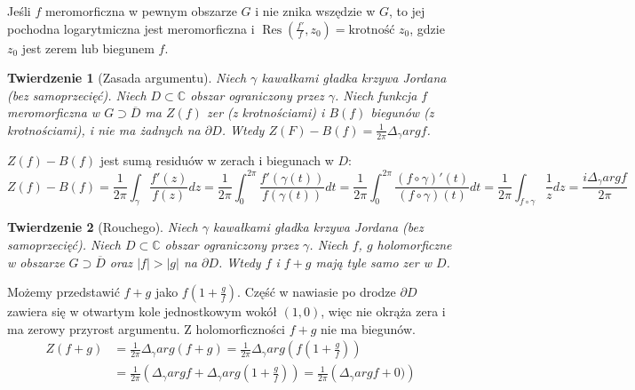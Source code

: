\documentclass[11pt]{article}
\newcommand{\abs}[1]{\left|#1\right|} %
\newcommand{\closure}[1]{\overline{#1}} %
\newcommand{\res}{\mathop{\text{Res}}\limits} %
\theoremstyle{plain}
\newtheorem*{theorem}{Twierdzenie}
\theoremstyle{definition}
\theoremstyle{remark}
\let\oldendproof\endproof
\renewenvironment{proof}[1][\proofname]{
  \oldproof[\textsc{\small #1}]
}{\oldendproof}
\begin{document}
Jeśli $ f $ meromorficzna w pewnym obszarze $G$ i nie znika wszędzie w $G$,
to jej pochodna logarytmiczna jest meromorficzna i $ \res(\frac{f'}{f}, z_0) = \text{krotność } z_0 $,
gdzie $ z_0 $ jest zerem lub biegunem $f$.


\begin{theorem}[Zasada argumentu]
  Niech $\gamma$ kawałkami gładka krzywa Jordana (bez samoprzecięć).
  Niech $ D \subset \mathbb{C} $ obszar ograniczony przez $ \gamma $.
  Niech funkcja $f$ meromorficzna w $ G \supset \closure{D} $ ma $ Z(f) $ zer (z krotnościami) i $ B(f) $ biegunów (z krotnościami), i nie ma żadnych na $ \partial D $.
  Wtedy $ Z(F) - B(f) = \frac{1}{2 \pi} \Delta_{\gamma} arg f $.
\end{theorem}

\begin{proof}
  $ Z(f) - B(f) $ jest sumą residuów w zerach i biegunach w $ D $: %
  $$
    Z(f) - B(f)
    = \frac{1}{2 \pi} \int_{\gamma} \frac{f'(z)}{f(z)} dz
    = \frac{1}{2 \pi} \int_{0}^{2 \pi} \frac{f'(\gamma(t))}{f(\gamma(t))} dt
    = \frac{1}{2 \pi} \int_{0}^{2 \pi} \frac{(f \circ \gamma)'(t)}{(f \circ \gamma)(t)} dt
    = \frac{1}{2 \pi} \int_{f \circ \gamma} \frac{1}{z} dz
    = \frac{i \Delta_{\gamma} arg f}{2 \pi}
  $$
\end{proof}

\begin{theorem}[Rouchego]
  Niech $\gamma$ kawałkami gładka krzywa Jordana (bez samoprzecięć).
  Niech $ D \subset \mathbb{C} $ obszar ograniczony przez $ \gamma $.
  Niech $f$, $g$ holomorficzne w obszarze $ G \supset \closure{D} $ oraz $ \abs{f} > \abs{g} $ na $ \partial D $.
  Wtedy $f$ i $f+g$ mają tyle samo zer w $D$.
\end{theorem}


\begin{proof}
  Możemy przedstawić $ f+g $ jako $ f(1+\frac{g}{f}) $.
  Część w nawiasie po drodze $ \partial D $ zawiera się w otwartym kole jednostkowym wokół $ (1, 0) $, więc nie okrąża zera i ma zerowy przyrost argumentu.
  Z holomorficzności $f+g$ nie ma biegunów.
  \begin{align*}
    Z(f+g) &
    = \frac{1}{2 \pi} \Delta_{\gamma} arg(f+g)
    = \frac{1}{2 \pi} \Delta_{\gamma} arg \left( f\left(1+\frac{g}{f}\right) \right) \\ &
    = \frac{1}{2 \pi} \left( \Delta_{\gamma} arg f + \Delta_{\gamma} arg\left(1+\frac{g}{f}\right) \right)
    = \frac{1}{2 \pi} \left( \Delta_{\gamma} arg f + 0) \right)
  \end{align*}
\end{proof}
\end{document}
